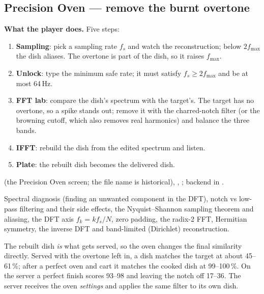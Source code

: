\documentclass[11pt,a4paper]{article}
\begin{document}
\subsection{Precision Oven --- remove the burnt overtone}
\textbf{What the player does.} Five steps:
\begin{enumerate}
\item \textbf{Sampling}: pick a sampling rate $f_s$ and watch the reconstruction; below
  $2f_{\max}$ the dish aliases. The overtone is part of the dish, so it raises $f_{\max}$.
\item \textbf{Unlock}: type the minimum safe rate; it must satisfy $f_s\geq 2f_{\max}$ and
  be at most 64\,Hz.
\item \textbf{FFT lab}: compare the dish's spectrum with the target's. The target has no
  overtone, so a spike stands out; remove it with the charred-notch filter (or the
  browning cutoff, which also removes real harmonics) and balance the three bands.
\item \textbf{IFFT}: rebuild the dish from the edited spectrum and listen.
\item \textbf{Plate}: the rebuilt dish becomes the delivered dish.
\end{enumerate}
\begin{filesbox}
 (the Precision Oven screen; the file name
is historical), ,
; backend  in .
\end{filesbox}
\begin{conceptbox}
Spectral diagnosis (finding an unwanted component in the DFT), notch vs low-pass filtering
and their side effects, the Nyquist--Shannon sampling theorem and aliasing, the DFT axis
$f_k=kf_s/N$, zero padding, the radix-2 FFT, Hermitian symmetry, the inverse DFT and
band-limited (Dirichlet) reconstruction.
\end{conceptbox}
\begin{impactbox}
The rebuilt dish \emph{is} what gets served, so the oven changes the final similarity
directly. Served with the overtone left in, a dish matches the target at about 45--61\,\%;
after a perfect oven and cart it matches the cooked dish at 99--100\,\%. On the server a
perfect finish scores 93--98 and leaving the notch off 17--36. The server receives the oven
\emph{settings} and applies the same filter to its own dish.
\end{impactbox}
\end{document}
